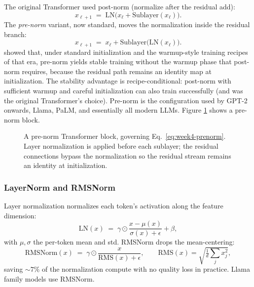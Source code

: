The original Transformer used post-norm (normalize after the residual
add):
\begin{equation}
x_{\ell+1} \;=\; \mathrm{LN}\bigl(x_\ell + \mathrm{Sublayer}(x_\ell)\bigr).
\end{equation}
The \emph{pre-norm} variant, now standard, moves the normalization
inside the residual branch:
\begin{equation}
\label{eq:week4-prenorm}
x_{\ell+1} \;=\; x_\ell + \mathrm{Sublayer}\bigl(\mathrm{LN}(x_\ell)\bigr).
\end{equation}
\citet{xiong2020onlayer} showed that, under standard initialization
and the warmup-style training recipes of that era, pre-norm yields
stable training without the warmup phase that post-norm requires,
because the residual path remains an identity map at initialization.
The stability advantage is recipe-conditional: post-norm with
sufficient warmup and careful initialization can also train
successfully (and was the original Transformer's choice). Pre-norm is the
configuration used by GPT-2 onwards, Llama, PaLM, and essentially all
modern LLMs. Figure \ref{fig:week4-block} shows a pre-norm block.

\begin{figure}[h]
\centering

\caption{A pre-norm Transformer block, governing
  Eq.~\eqref{eq:week4-prenorm}. Layer normalization is applied before
  each sublayer; the residual connections bypass the normalization so
  the residual stream remains an identity at initialization.}
\label{fig:week4-block}
\end{figure}

\subsubsection{LayerNorm and RMSNorm}

Layer normalization \citep{ba2016layernorm} normalizes each token's
activation along the feature dimension:
\begin{equation}
\mathrm{LN}(x) \;=\; \gamma \odot \frac{x - \mu(x)}{\sigma(x) + \epsilon} + \beta,
\end{equation}
with $\mu, \sigma$ the per-token mean and std. RMSNorm
\citep{zhang2019rmsnorm} drops the mean-centering:
\begin{equation}
\label{eq:week4-rmsnorm}
\mathrm{RMSNorm}(x) \;=\; \gamma \odot \frac{x}{\mathrm{RMS}(x) + \epsilon},
\qquad
\mathrm{RMS}(x) = \sqrt{\tfrac{1}{d}\sum_j x_j^2},
\end{equation}
saving $\sim\!7\%$ of the normalization compute with no quality loss
in practice. Llama family models use RMSNorm.

